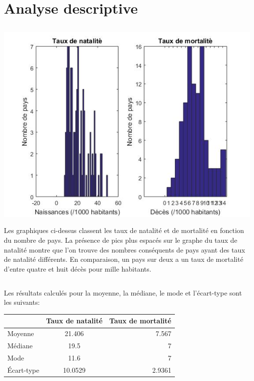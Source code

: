 \documentclass[a4paper,10pt]{article}
\begin{document}
	
\section{Analyse descriptive}
\subsection{ }
	
		\begin{center}
			\includegraphics[width=150mm]{Figure1.jpg}
		\end{center}

Les graphiques ci-dessus classent les taux de natalité et de mortalité en fonction du nombre de pays. La présence de pics plus espacés sur le graphe du taux de natalité montre que l'on trouve des nombres conséquents de pays ayant des taux de natalité différents. En comparaison, un pays sur deux a un taux de mortalité d'entre quatre et huit décès pour mille habitants.

\subsection{ }
Les résultats calculés pour la moyenne, la médiane, le mode et l'écart-type sont les suivants: \\



\begin{tabular}{|l|c|r|}
	\hline
	  & Taux de natalité & Taux de mortalité \\
	\hline
	Moyenne & 21.406  & 7.567 \\
	Médiane & 19.5 & 7 \\
	Mode & 11.6 & 7 \\
	Écart-type & 10.0529 & 2.9361 \\
	\hline
\end{tabular}
\\
\end{document}
